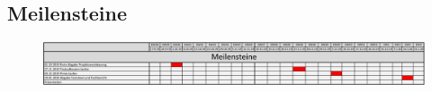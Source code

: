 \begin{landscape}
\subsection{Meilensteine}\label{subsec:Meilensteine}
 \begin{figure}[h]
   \centering
   \noindent\includegraphics[width=\linewidth,height=.9\textheight,keepaspectratio]{graphics/Meilensteine.pdf}
   \label{pic:Meilensteine}
\end{figure}
\vfill
\end{landscape}